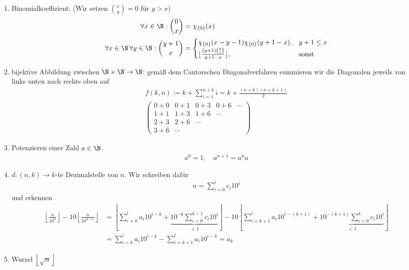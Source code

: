 \begin{solution}
\begin{enumerate}
		\item Binomialkoeffizient: (Wir setzen $\binom{x}{y} = 0$ für $y > x$)
		\begin{align*}
			\forall x \in \N: \binom{0}{x} &= \chi_{\{0\}}(x) \\
			\forall x \in \N\,\forall y \in \N: \binom{y+1}{x} &= \begin{cases}
				\chi_{\{0\}}(x-y-1)\chi_{\{0\}}(y+1-x), & y+1 \leq x \\
				\lfloor\frac{(y+1)\binom{y}{x}}{y+1-x}\rfloor, & \text{sonst}
			\end{cases}
		\end{align*}
		\item bijektive Abbildung zwischen $\N \times \N \to \N$: gemäß dem Cantorschen Diagonalverfahren summieren wir die Diagonalen jeweils von links unten nach rechts oben auf
			\begin{align*}
			f(k,n) := k + \sum_{i = 1}^{n + k} i = k + \frac{(n + k) (n + k + 1)}{2} \\
			\begin{pmatrix}
				0 + 0 & 0 + 1 & 0 + 3 & 0 + 6 & \cdots \\
				1 + 1 & 1 + 3 & 1 + 6 & \cdots & \\
				2 + 3 & 2 + 6 & \cdots & & \\
				3 + 6 & \cdots &&&
			\end{pmatrix}
			\end{align*}
		\item Potenzieren einer Zahl $a \in \N$.
			\begin{align*}
			a^0 = 1, \quad a^{n + 1} = a^n a
			\end{align*}
		\item $d:(n,k) \to k$-te Dezimalstelle von $n$. Wir schreiben dafür 
			\begin{align*}
			n = \sum_{i = 0}^l c_i 10^i
			\end{align*}
		und erkennen
			\begin{align*}
			\left\lfloor \frac{n}{10^k} \right\rfloor - 10 \left\lfloor \frac{n}{10^{k + 1}} \right\rfloor &=  \left\lfloor \sum_{i = k}^l a_i 10^{i - k} + \underbrace{10^{-k} \sum_{i = 0}^{k - 1} c_i 10^i}_{< 1} \right\rfloor - 10 \left\lfloor \sum_{i = k + 1}^l a_i 10^{i - (k + 1)} + \underbrace{10^{-(k + 1)} \sum_{i = 0}^{k} c_i 10^i}_{< 1} \right\rfloor \\
			&= \sum_{i = k}^l a_i 10^{i - k} - \sum_{i = k + 1}^l a_i 10^{i - k} = a_k
			\end{align*} 
		\item Wurzel $\left\lfloor \sqrt{n} \right \rfloor$

\end{enumerate}
\end{solution}
